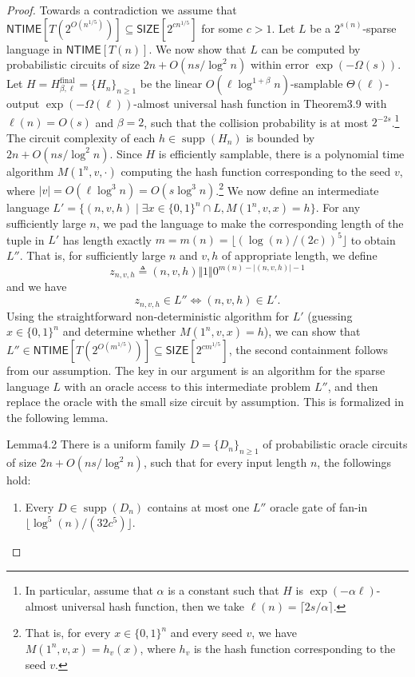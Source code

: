 \begin{proof}
Towards a contradiction we assume that $\mathsf{NTIME}[T(2^{O(n^{1/5})})]\subseteq\mathsf{SIZE}[2^{cn^{1/5}}]$ for some $c>1$. Let $L$ be a $2^{s(n)}$-sparse language in $\mathsf{NTIME}[T(n)]$. We now show that $L$ can be computed by probabilistic circuits of size $2n+O(ns/\log^2n)$ within error $\exp(-\Omega(s))$.
Let $H=H^{\mathrm{final}}_{\beta,\ell}=\{H_n\}_{n\ge1}$ be the linear $O(\ell\log^{1+\beta}n)$-samplable $\Theta(\ell)$-output $\exp(-\Omega(\ell))$-almost universal hash function in Theorem3.9 with $\ell(n)=O(s)$ and $\beta=2$, such that the collision probability is at most $2^{-2s}$.\footnote{In particular, assume that $\alpha$ is a constant such that $H$ is $\exp(-\alpha\ell)$-almost universal hash function, then we take $\ell(n)=\lceil2s/\alpha\rceil$.} The circuit complexity of each $h\in\operatorname{supp}(H_n)$ is bounded by $2n+O(ns/\log^2n)$. Since $H$ is efficiently samplable, there is a polynomial time algorithm $M(1^n,v,\cdot)$ computing the hash function corresponding to the seed $v$, where $|v|=O(\ell\log^3n)=O(s\log^3n)$.\footnote{That is, for every $x\in\{0,1\}^n$ and every seed $v$, we have $M(1^n,v,x)=h_v(x)$, where $h_v$ is the hash function corresponding to the seed $v$.}
We now define an intermediate language $L'=\{(n,v,h)\mid\exists x\in\{0,1\}^n\cap L,M(1^n,v,x)=h\}$. For any sufficiently large $n$, we pad the language to make the corresponding length of the tuple in $L'$ has length exactly $m=m(n)=\lfloor(\log(n)/(2c))^5\rfloor$ to obtain $L''$. That is, for sufficiently large $n$ and $v,h$ of appropriate length, we define
\[z_{n,v,h}\triangleq(n,v,h)\Vert1\Vert0^{m(n)-|(n,v,h)|-1}\]
and we have
\[z_{n,v,h}\in L''\Longleftrightarrow(n,v,h)\in L'.\]
Using the straightforward non-deterministic algorithm for $L'$ (guessing $x\in\{0,1\}^n$ and determine whether $M(1^n,v,x)=h$), we can show that $L''\in\mathsf{NTIME}[T(2^{O(m^{1/5})})]\subseteq\mathsf{SIZE}[2^{cm^{1/5}}]$, the second containment follows from our assumption.
The key in our argument is an algorithm for the sparse language $L$ with an oracle access to this intermediate problem $L''$, and then replace the oracle with the small size circuit by assumption. This is formalized in the following lemma.
\begin{authorclaim}{Lemma4.2}
There is a uniform family $D=\{D_n\}_{n\ge1}$ of probabilistic oracle circuits of size $2n+O(ns/\log^2n)$, such that for every input length $n$, the followings hold:
\begin{enumerate}
\item Every $D\in\operatorname{supp}(D_n)$ contains at most one $L''$ oracle gate of fan-in $\lfloor\log^5(n)/(32c^5)\rfloor$.

\end{enumerate}
\end{authorclaim}
\end{proof}
